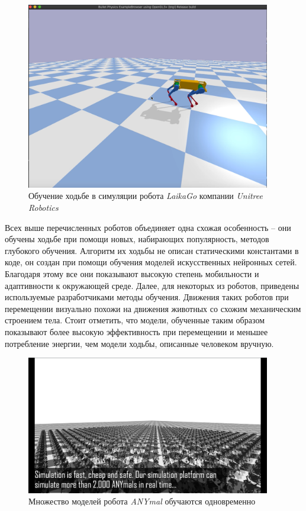 \begin{figure}[h]
    \centering
    \includegraphics[width=0.95\textwidth]{chapter_intro/figure5.png}
    \caption{Обучение ходьбе в симуляции робота \textit{LaikaGo} компании \textit{ Unitree Robotics} }
    \label{fig:intro4}
\end{figure}

Всех выше перечисленных роботов объединяет одна схожая особенность -- они обучены ходьбе при помощи новых, набирающих популярность, методов глубокого обучения. Алгоритм их ходьбы не описан статическими константами в коде, он создан при помощи обучения моделей искусственных нейронных сетей. Благодаря этому все они показывают высокую степень мобильности и адаптивности к окружающей среде. Далее, для некоторых из роботов, приведены используемые разработчиками методы обучения. Движения таких роботов при перемещении визуально похожи на движения животных со схожим механическим строением тела. 
Стоит отметить, что модели, обученные таким образом показывают более высокую эффективность при перемещении \cite{Hwangbo2019} и меньшее потребление энергии, чем модели ходьбы, описанные человеком вручную.

\begin{figure}[h!]
    \centering
    \includegraphics[width=0.95\textwidth]{chapter_intro/figure6.png}
    \caption{Множество моделей робота \textit{ANYmal} обучаются одновременно }
    \label{fig:intro5}
\end{figure}

